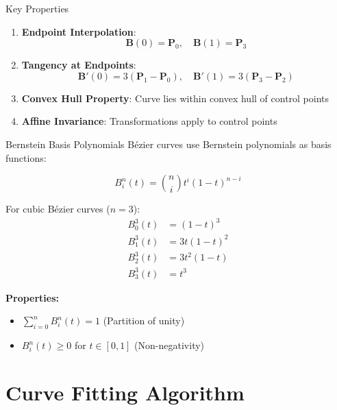 \documentclass{beamer}
\begin{document}
\begin{frame}{Key Properties}
\begin{theorem}
\begin{enumerate}
    \item \textbf{Endpoint Interpolation}: 
    \begin{equation*}
    \mathbf{B}(0) = \mathbf{P}_0, \quad \mathbf{B}(1) = \mathbf{P}_3
    \end{equation*}
    
    \item \textbf{Tangency at Endpoints}:
    \begin{equation*}
    \mathbf{B}'(0) = 3(\mathbf{P}_1 - \mathbf{P}_0), \quad \mathbf{B}'(1) = 3(\mathbf{P}_3 - \mathbf{P}_2)
    \end{equation*}
    
    \item \textbf{Convex Hull Property}: Curve lies within convex hull of control points
    
    \item \textbf{Affine Invariance}: Transformations apply to control points
\end{enumerate}
\end{theorem}
\end{frame}

\begin{frame}{Bernstein Basis Polynomials}
Bézier curves use Bernstein polynomials as basis functions:

\begin{equation*}
B_i^n(t) = \binom{n}{i}t^i(1-t)^{n-i}
\end{equation*}

For cubic Bézier curves ($n=3$):
\begin{align*}
B_0^3(t) &= (1-t)^3 \\
B_1^3(t) &= 3t(1-t)^2 \\
B_2^3(t) &= 3t^2(1-t) \\
B_3^3(t) &= t^3
\end{align*}

\textbf{Properties:}
\begin{itemize}
    \item $\sum_{i=0}^{n} B_i^n(t) = 1$ (Partition of unity)
    \item $B_i^n(t) \geq 0$ for $t \in [0,1]$ (Non-negativity)
\end{itemize}
\end{frame}

\section{Curve Fitting Algorithm}
\end{document}

